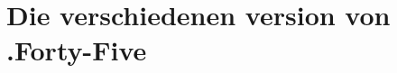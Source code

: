 
\section{Die verschiedenen version von .Forty-Five}\label{sec:verschiedene-versionen}

\renewcommand{\kapitelautor}{Autor: Irgendwer} %

%
%

\renewcommand{\kapitelautor}{}
